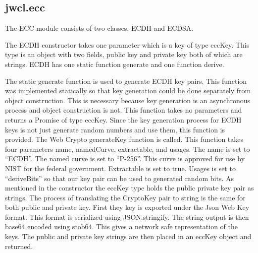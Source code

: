 \subsection{jwcl.ecc}


The ECC module consists of two classes, ECDH and ECDSA. 


The ECDH constructor takes one parameter which is a key of type eccKey. This type is an object with two fields, public key and private key both of which are strings. ECDH has one static function generate and one function derive. 


The static generate function is used to generate ECDH key pairs. This function was implemented statically so that key generation could be done separately from object construction. This is necessary because key generation is an asynchronous process and object construction is not. This function takes no parameters and returns a Promise of type eccKey. Since the key generation process for ECDH keys is not just generate random numbers and use them, this function is provided. The Web Crypto generateKey function is called. This function takes four parameters name, namedCurve, extractable, and usages. The name is set to “ECDH”. The named curve is set to “P-256”. This curve is approved for use by NIST for the federal government.\cite{nist-curves}
Extractable is set to true. Usages is set to “deriveBits” so that our key pair can be used to generated random bits. As mentioned in the constructor the eccKey type holds the public private key pair as strings. The process of translating the CryptoKey pair to string is the same for both public and private key. First they key is exported under the Json Web Key format. This format is serialized using JSON.stringify. The string output is then base64 encoded using stob64. This gives a network safe representation of the keys. The public and private key strings are then placed in an eccKey object and returned.


